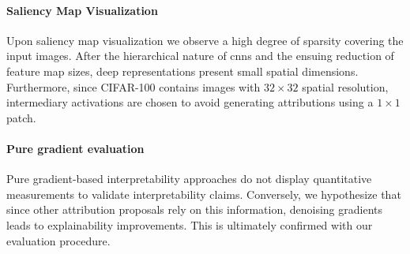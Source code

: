 \paragraph{Saliency Map Visualization} Upon saliency map visualization we observe a high degree of 
sparsity covering the input images. After the hierarchical nature 
of \glspl{cnn} and the ensuing reduction of feature map sizes, deep representations present small  
spatial dimensions. Furthermore, since CIFAR-100 contains images with $32\times32$ spatial 
resolution, intermediary activations are chosen to avoid generating attributions using a 
$1\times1$ patch.

\paragraph{Pure gradient evaluation} Pure gradient-based interpretability approaches do not 
display quantitative measurements to validate interpretability claims. Conversely, we hypothesize 
that since other attribution proposals rely on this information, denoising gradients leads to 
explainability improvements. This is ultimately confirmed with our evaluation procedure.